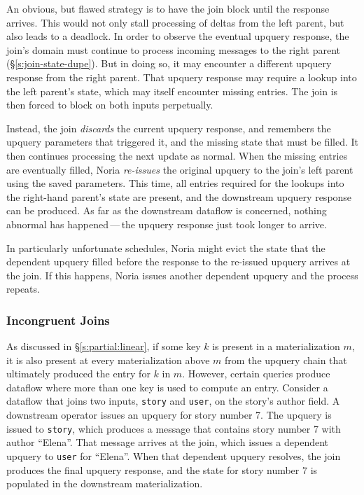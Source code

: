 An obvious, but flawed strategy is to have the join block until the response
arrives. This would not only stall processing of deltas from the left parent,
but also leads to a deadlock. In order to observe the eventual upquery response,
the join's domain must continue to process incoming messages to the right parent
(\S\ref{s:join-state-dupe}). But in doing so, it may encounter a different
upquery response from the right parent. That upquery response may require a
lookup into the left parent's state, which may itself encounter missing entries.
The join is then forced to block on both inputs perpetually.

Instead, the join \emph{discards} the current upquery response, and remembers
the upquery parameters that triggered it, and the missing state that must be
filled. It then continues processing the next update as normal. When the missing
entries are eventually filled, Noria \emph{re-issues} the original upquery to
the join's left parent using the saved parameters. This time, all entries
required for the lookups into the right-hand parent's state are present, and the
downstream upquery response can be produced. As far as the downstream dataflow
is concerned, nothing abnormal has happened\,---\,the upquery response just took
longer to arrive.

In particularly unfortunate schedules, Noria might evict the state that the
dependent upquery filled before the response to the re-issued upquery arrives at
the join. If this happens, Noria issues another dependent upquery and the
process repeats.

\subsubsection{Incongruent Joins}
\label{join-evictions}

As discussed in \S\ref{s:partial:linear}, if some key $k$ is present in a
materialization $m$, it is also present at every materialization above $m$ from
the upquery chain that ultimately produced the entry for $k$ in $m$. However,
certain queries produce dataflow where more than one key is used to compute an
entry. Consider a dataflow that joins two inputs, \texttt{story} and
\texttt{user}, on the story's author field. A downstream operator issues an
upquery for story number 7. The upquery is issued to \texttt{story}, which
produces a message that contains story number 7 with author ``Elena''. That
message arrives at the join, which issues a dependent upquery to \texttt{user}
for ``Elena''. When that dependent upquery resolves, the join produces the final
upquery response, and the state for story number 7 is populated in the
downstream materialization.

